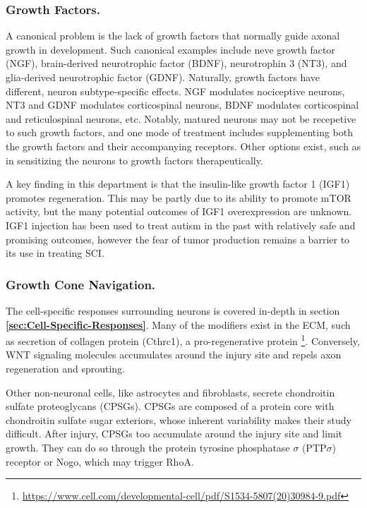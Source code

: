 \documentclass[12pt]{report}
\begin{document}
\subsubsection{Growth Factors.}

A canonical problem is the lack of growth factors that normally guide axonal growth in development. Such canonical examples include neve growth factor (NGF), brain-derived neurotrophic factor (BDNF), neurotrophin 3 (NT3), and glia-derived neurotrophic factor (GDNF). Naturally, growth factors have different, neuron subtype-specific effects. NGF modulates nociceptive neurons, NT3 and GDNF modulates corticospinal neurons, BDNF modulates corticospinal and reticulospinal neurons, etc. Notably, matured neurons may not be recepetive to such growth factors, and one mode of treatment includes supplementing both the growth factors and their accompanying receptors. Other options exist, such as in sensitizing the neurons to growth factors therapeutically.\newline

A key finding in this department is that the insulin-like growth factor 1 (IGF1) promotes regeneration. This may be partly due to its ability to promote mTOR activity, but the many potential outcomes of IGF1 overexpression are unknown. IGF1 injection has been used to treat autism in the past with relatively safe and promising outcomes, however the fear of tumor production remains a barrier to its use in treating SCI.

\subsubsection{Growth Cone Navigation.}

The cell-specific responses surrounding neurons is covered in-depth in section \textbf{\ref{sec:Cell-Specific-Responses}}. Many of the modifiers exist in the ECM, such as secretion of collagen protein (Cthrc1), a pro-regenerative protein \footnote{\url{https://www.cell.com/developmental-cell/pdf/S1534-5807(20)30984-9.pdf}}. Conversely, WNT signaling molecules accumulates around the injury site and repels axon regeneration and sprouting.\newline 

Other non-neuronal cells, like astrocytes and fibroblasts, secrete chondroitin sulfate proteoglycans (CPSGs). CPSGs are composed of a protein core with chondroitin sulfate sugar exteriors, whose inherent variability makes their study difficult. After injury, CPSGs too accumulate around the injury site and limit growth.  They can do so through the protein tyrosine phosphatase $\sigma$ (PTP$\sigma$) receptor or Nogo, which may trigger RhoA.  \newline
\end{document}
